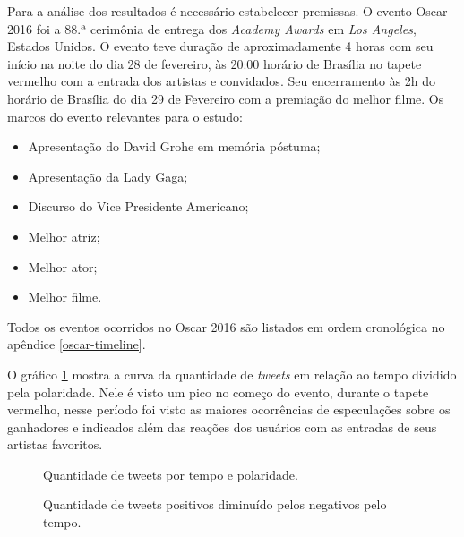 Para a análise dos resultados é necessário estabelecer premissas. O evento Oscar 2016 foi a  88.ª cerimônia de entrega dos \textit{Academy Awards} em \textit{Los Angeles}, Estados Unidos. O evento teve duração de aproximadamente 4 horas com seu início na noite do dia 28 de fevereiro, às 20:00 horário de Brasília no tapete vermelho com a entrada dos artistas e convidados. Seu encerramento às 2h do horário de Brasília do dia 29 de Fevereiro com a premiação do melhor filme. Os marcos do evento relevantes para o estudo: 
\begin{itemize}
	\item Apresentação do David Grohe em memória póstuma;
	\item Apresentação da Lady Gaga;
	\item Discurso do Vice Presidente Americano;
	\item Melhor atriz;
	\item Melhor ator;
	\item Melhor filme.
\end{itemize}

Todos os eventos ocorridos no Oscar 2016 são listados em ordem cronológica no apêndice \ref{oscar-timeline}.

O gráfico \ref{qtd} mostra a curva da quantidade de \textit{tweets} em relação ao tempo  dividido pela polaridade. Nele é visto um pico  no começo do evento, durante o tapete vermelho, nesse período foi visto as maiores ocorrências de especulações sobre os ganhadores e indicados além das reações dos usuários com as entradas de seus artistas favoritos.

\begin{figure}[H]
	\centering{}
	\caption{Quantidade de tweets por tempo e polaridade.}
	\label{qtd}
\end{figure}

\begin{figure}[H]
	\centering{}
	\caption{Quantidade de tweets positivos diminuído pelos negativos pelo tempo.}
	\label{qtdnegpos}
\end{figure}

